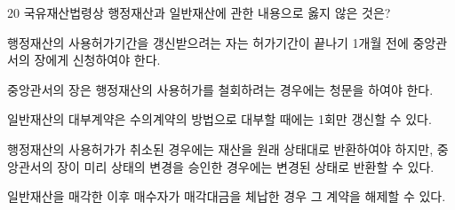 \begin{question}{20}
국유재산법령상 행정재산과 일반재산에 관한 내용으로 옳지 않은 것은?
\begin{choices}
  \item 행정재산의 사용허가기간을 갱신받으려는 자는 허가기간이 끝나기 1개월 전에 중앙관서의 장에게 신청하여야 한다.
  \item 중앙관서의 장은 행정재산의 사용허가를 철회하려는 경우에는 청문을 하여야 한다.
  \item 일반재산의 대부계약은 수의계약의 방법으로 대부할 때에는 1회만 갱신할 수 있다.
  \item 행정재산의 사용허가가 취소된 경우에는 재산을 원래 상태대로 반환하여야 하지만, 중앙관서의 장이 미리 상태의 변경을 승인한 경우에는 변경된 상태로 반환할 수 있다.
  \item 일반재산을 매각한 이후 매수자가 매각대금을 체납한 경우 그 계약을 해제할 수 있다.
\end{choices}
\end{question}
